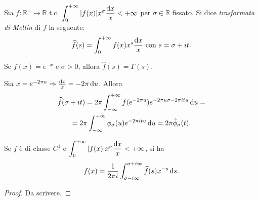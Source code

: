 \begin{defn}
  Sia $f:\mathbb{R}^+ \longrightarrow \mathbb{R}$ t.c. $\displaystyle \int_0^{+\infty} |f(x)|x^{\sigma}\frac{\mathop{}\!\mathrm{d} x}{x}<+\infty$ per $\sigma \in \mathbb{R}$ fissato. Si dice \textit{trasformata di Mellin} di $f$ la seguente:
  $$\wideparen{f}(s)=\int_0^{+\infty} f(x)x^s\frac{\diff x}{x}\text{ con }s=\sigma+it.$$
\end{defn}

\begin{ex}
  Se $f(x)=e^{-x}$ e $\sigma>0$, allora $\wideparen{f}(s)=\Gamma(s)$.
\end{ex}

\begin{oss}
  Sia $x=e^{-2\pi u} \Rightarrow \frac{\mathop{}\!\mathrm{d} x}{x}=-2\pi\mathop{}\!\mathrm{d} u$. Allora
  \begin{gather*}
    \wideparen{f}(\sigma+it)=2\pi\int_{-\infty}^{+\infty} f(e^{-2\pi u})e^{-2\pi u\sigma-2\pi itu}\diff u= \\
    =2\pi \int_{-\infty}^{+\infty} \phi_{\sigma}(u)e^{-2\pi itu}\diff u=2\pi\hat{\phi}_{\sigma}(t).
  \end{gather*}
\end{oss}

\begin{prop}
  Se $f$ è di classe $C^1$ e $\displaystyle \int_0^{+\infty} |f(x)|x^{\sigma}\frac{\mathop{}\!\mathrm{d} x}{x}<+\infty$, si ha
  $$f(x)=\frac{1}{2\pi i} \int_{\sigma-i\infty}^{\sigma+i\infty} \wideparen{f}(s)x^{-s}\diff s.$$
\end{prop}

\begin{proof}
  Da scrivere.
\end{proof}
